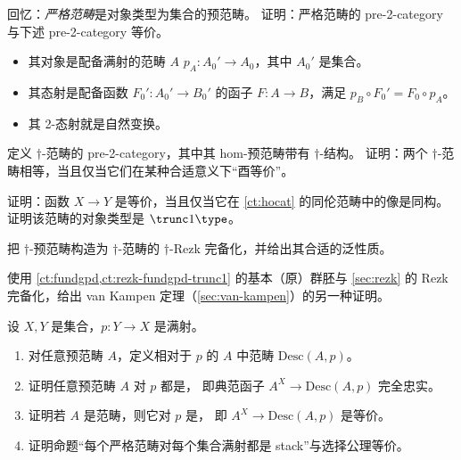\begin{ex}\label{ex:2strict-cat}
  回忆：\emph{严格范畴}是对象类型为集合的预范畴。
  证明：严格范畴的 pre-2-category 与下述 pre-2-category 等价。
  \begin{itemize}
  \item 其对象是配备满射的范畴 $A$
    $p_A:A_0'\to A_0$，其中 $A_0'$ 是集合。
  \item 其态射是配备函数 $F_0':A_0' \to B_0'$ 的函子 $F:A\to B$，满足 $p_B \circ F_0' = F_0 \circ p_A$。
  \item 其 2-态射就是自然变换。
  \end{itemize}
\end{ex}

\begin{ex}\label{ex:pre2dagger-cat}
  定义 $\dagger$-范畴的 pre-2-category，其中其 hom-预范畴带有 $\dagger$-结构。
  证明：两个 $\dagger$-范畴相等，当且仅当它们在某种合适意义下“酉等价”。
\end{ex}

\begin{ex}\label{ct:ex:hocat}
  证明：函数 $X\to Y$ 是等价，当且仅当它在 \cref{ct:hocat} 的同伦范畴中的像是同构。
  证明该范畴的对象类型是 $\trunc1\type$。
\end{ex}

\begin{ex}\label{ex:dagger-rezk}
  把 $\dagger$-预范畴构造为 $\dagger$-范畴的 $\dagger$-Rezk 完备化，并给出其合适的泛性质。
\end{ex}

\begin{ex}\label{ex:rezk-vankampen}
  使用 \cref{ct:fundgpd,ct:rezk-fundgpd-trunc1} 的基本（原）群胚与 \cref{sec:rezk} 的 Rezk 完备化，给出 van Kampen 定理（\cref{sec:van-kampen}）的另一种证明。
\end{ex}

\begin{ex}\label{ex:stack}
  设 $X,Y$ 是集合，$p:Y\to X$ 是满射。
  \begin{enumerate}
  \item 对任意预范畴 $A$，定义相对于 $p$ 的 $A$ 中范畴 $\mathrm{Desc}(A,p)$。
  \item 证明任意预范畴 $A$ 对 $p$ 都是，
    即典范函子 $A^X \to \mathrm{Desc}(A,p)$ 完全忠实。
  \item 证明若 $A$ 是范畴，则它对 $p$ 是，
    即 $A^X \to \mathrm{Desc}(A,p)$ 是等价。
  \item 证明命题“每个严格范畴对每个集合满射都是 stack”与选择公理等价。
  \end{enumerate}
\end{ex}

